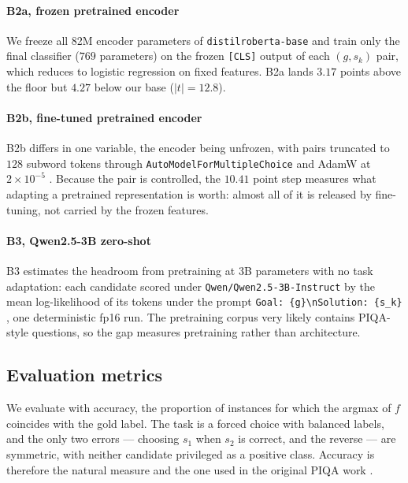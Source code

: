 \documentclass[11pt]{article}
\begin{document}
\paragraph{B2a, frozen pretrained encoder}
We freeze all 82M encoder parameters of \texttt{distilroberta-base}
\citep{sanh2019distilbert,liu2019roberta} and train only the final classifier
($769$ parameters) on the frozen \texttt{[CLS]} output of each $(g,s_k)$
pair, which reduces to logistic regression on fixed features. B2a lands
$3.17$ points above the floor but $4.27$ below our base ($|t| = 12.8$).

\paragraph{B2b, fine-tuned pretrained encoder}
B2b differs in one variable, the encoder being unfrozen, with pairs truncated
to $128$ subword tokens through \texttt{AutoModelForMultipleChoice} and AdamW
at $2 \times 10^{-5}$ \citep{mosbach2021stability}. Because the pair is
controlled, the $10.41$ point step measures what adapting a pretrained
representation is worth: almost all of it is released by fine-tuning, not
carried by the frozen features.

\paragraph{B3, Qwen2.5-3B zero-shot}
B3 estimates the headroom from pretraining at 3B parameters with no task
adaptation: each candidate scored under \texttt{Qwen/Qwen2.5-3B-Instruct} by
the mean log-likelihood of its tokens under the prompt
\texttt{Goal: \{g\}\textbackslash nSolution: \{s\_k\}}
\citep{bisk2020piqa}, one deterministic fp16 run. The pretraining corpus very
likely contains PIQA-style questions, so the gap measures pretraining rather
than architecture.

\subsection{Evaluation metrics}
\label{sec:metrics}

We evaluate with accuracy, the proportion of instances for which the argmax
of $f$ coincides with the gold label. The task is a forced choice with
balanced labels, and the only two errors --- choosing $s_1$ when $s_2$ is
correct, and the reverse --- are symmetric, with neither candidate privileged
as a positive class. Accuracy is therefore the natural measure and the one
used in the original PIQA work \citep{bisk2020piqa}.
\end{document}
